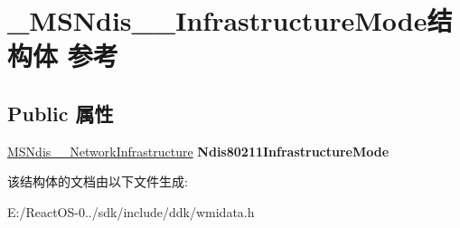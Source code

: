 \hypertarget{struct___m_s_ndis__80211___infrastructure_mode}{}\section{\+\_\+\+M\+S\+Ndis\+\_\+\_\+\+Infrastructure\+Mode结构体 参考}
\label{struct___m_s_ndis__80211___infrastructure_mode}
\subsection*{Public 属性}
\begin{DoxyCompactItemize}
\item 
\mbox{\label{struct___m_s_ndis__80211___infrastructure_mode_aa1a1577500ce20c2d8c15ad5e39a770f}} 
\hyperlink{struct___m_s_ndis__80211___network_infrastructure}{M\+S\+Ndis\+\_\+\_\+\+Network\+Infrastructure} {\bfseries Ndis80211\+Infrastructure\+Mode}
\end{DoxyCompactItemize}


该结构体的文档由以下文件生成\+:\begin{DoxyCompactItemize}
\item 
E\+:/\+React\+O\+S-\/0../sdk/include/ddk/wmidata.\+h\end{DoxyCompactItemize}
